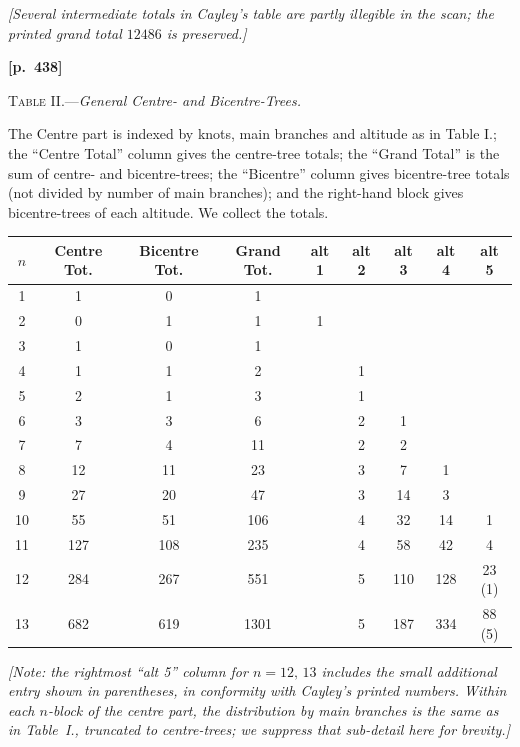 \documentclass[11pt,a4paper]{article}
\begin{document}
\noindent\textit{[Several intermediate totals in Cayley's table are partly illegible in the scan; the printed grand total $12486$ is preserved.]}

\newpage
\noindent\textbf{[p.~438]}\quad
\begin{center}
\textsc{Table II.}\quad---\quad\textit{General Centre- and Bicentre-Trees.}
\end{center}

\noindent The Centre part is indexed by knots, main branches and altitude as in Table I.; the ``Centre Total'' column gives the centre-tree totals; the ``Grand Total'' is the sum of centre- and bicentre-trees; the ``Bicentre'' column gives bicentre-tree totals (not divided by number of main branches); and the right-hand block gives bicentre-trees of each altitude. We collect the totals.

\medskip

\begin{center}
\begin{tabular}{c|cc|c|ccccc}
$n$ & Centre Tot. & Bicentre Tot. & Grand Tot. & alt 1 & alt 2 & alt 3 & alt 4 & alt 5\\\hline
1 & 1 & 0 & 1 & & & & &\\
2 & 0 & 1 & 1 & 1 & & & &\\
3 & 1 & 0 & 1 & & & & &\\
4 & 1 & 1 & 2 & & 1 & & &\\
5 & 2 & 1 & 3 & & 1 & & &\\
6 & 3 & 3 & 6 & & 2 & 1 & &\\
7 & 7 & 4 & 11 & & 2 & 2 & &\\
8 & 12 & 11 & 23 & & 3 & 7 & 1 &\\
9 & 27 & 20 & 47 & & 3 & 14 & 3 &\\
10 & 55 & 51 & 106 & & 4 & 32 & 14 & 1\\
11 & 127 & 108 & 235 & & 4 & 58 & 42 & 4\\
12 & 284 & 267 & 551 & & 5 & 110 & 128 & 23 \quad (1)\\
13 & 682 & 619 & 1301 & & 5 & 187 & 334 & 88 \quad (5)
\end{tabular}
\end{center}

\noindent\textit{[Note: the rightmost ``alt 5'' column for $n=12,\,13$ includes the small additional entry shown in parentheses, in conformity with Cayley's printed numbers. Within each $n$-block of the centre part, the distribution by main branches is the same as in Table~I., truncated to centre-trees; we suppress that sub-detail here for brevity.]}
\end{document}
